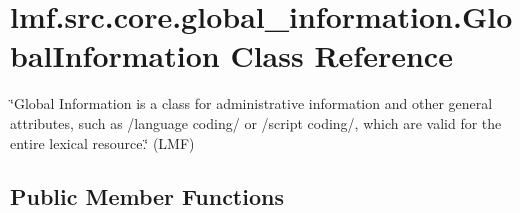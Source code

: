 \hypertarget{classlmf_1_1src_1_1core_1_1global__information_1_1_global_information}{\section{lmf.\+src.\+core.\+global\+\_\+information.\+Global\+Information Class Reference}
\label{classlmf_1_1src_1_1core_1_1global__information_1_1_global_information}
}


\char`\"{}\+Global Information is a class for administrative information and other general attributes, such as /language coding/ or /script coding/, which are valid for the entire lexical resource.\char`\"{} (L\+M\+F)  


\subsection*{Public Member Functions}
